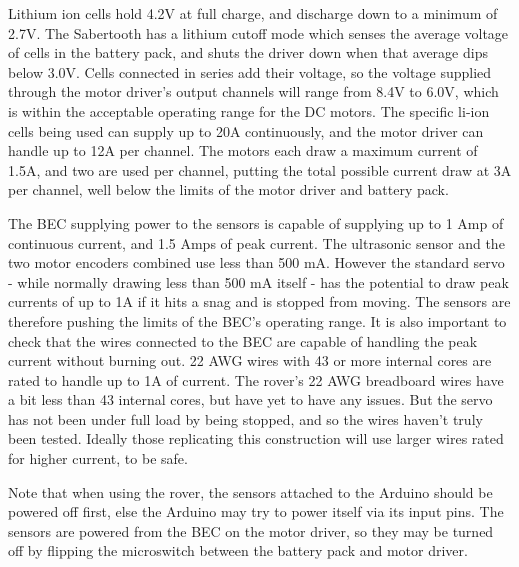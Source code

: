 Lithium ion cells hold 4.2V at full charge, and discharge down to a minimum of 2.7V. The Sabertooth has a lithium cutoff mode which senses the average voltage of cells in the battery pack, and shuts the driver down when that average dips below 3.0V. Cells connected in series add their voltage, so the voltage supplied through the motor driver's output channels will range from 8.4V to 6.0V, which is within the acceptable operating range for the DC motors. The specific li-ion cells being used can supply up to 20A continuously, and the motor driver can handle up to 12A per channel. The motors each draw a maximum current of 1.5A, and two are used per channel, putting the total possible current draw at 3A per channel, well below the limits of the motor driver and battery pack.

The BEC supplying power to the sensors is capable of supplying up to 1 Amp of continuous current, and 1.5 Amps of peak current. The ultrasonic sensor and the two motor encoders combined use less than 500 mA. However the standard servo - while normally drawing less than 500 mA itself -  has the potential to draw peak currents of up to 1A if it hits a snag and is stopped from moving. The sensors are therefore pushing the limits of the BEC's operating range. It is also important to check that the wires connected to the BEC are capable of handling the peak current without burning out. 22 AWG wires with 43 or more internal cores are rated to handle up to 1A of current. The rover's 22 AWG breadboard wires have a bit less than 43 internal cores, but have yet to have any issues. But the servo has not been under full load by being stopped, and so the wires haven't truly been tested. Ideally those replicating this construction will use larger wires rated for higher current, to be safe.

Note that when using the rover, the sensors attached to the Arduino should be powered off first, else the Arduino may try to power itself via its input pins. The sensors are powered from the BEC on the motor driver, so they may be turned off by flipping the microswitch between the battery pack and motor driver.
